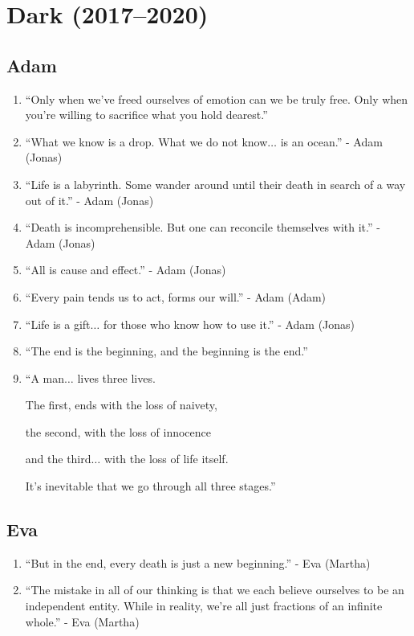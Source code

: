 \documentclass{book}
\numberwithin{equation}{section}
\begin{document}

\chapter{Dark (2017--2020)}

\section{Adam}
\begin{enumerate}
    \item ``Only when we've freed ourselves of emotion can we be truly free. Only when you're willing to sacrifice what you hold dearest.''
    \item ``What we know is a drop. What we do not know$\ldots$ is an ocean.'' - Adam (Jonas)
    \item ``Life is a labyrinth. Some wander around until their death in search of a way out of it.'' - Adam (Jonas)
    \item ``Death is incomprehensible. But one can reconcile themselves with it.'' - Adam (Jonas)
    \item ``All is cause and effect.'' - Adam (Jonas)
    \item ``Every pain tends us to act, forms our will.'' - Adam (Adam)
    \item ``Life is a gift$\ldots$ for those who know how to use it.'' - Adam (Jonas)
    \item ``The end is the beginning, and the beginning is the end.''
    \item ``A man$\ldots$ lives three lives.
    
    The first, ends with the loss of naivety,
    
    the second, with the loss of innocence
    
    and the third$\ldots$ with the loss of life itself.
    
    It's inevitable that we go through all three stages.''
\end{enumerate}

\section{Eva}
\begin{enumerate}
    \item ``But in the end, every death is just a new beginning.'' - Eva (Martha)
    \item ``The mistake in all of our thinking is that we each believe ourselves to be an independent entity. While in reality, we're all just fractions of an infinite whole.'' - Eva (Martha)
\end{enumerate}
\end{document}
